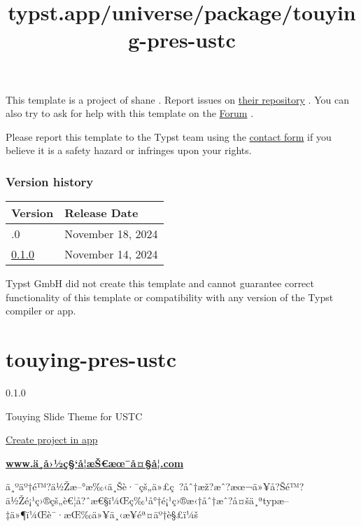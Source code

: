 This template is a project of shane . Report issues on
\href{https://github.com/shaneworld/HHU-Thesis-Template}{their
repository} . You can also try to ask for help with this template on the
\href{https://forum.typst.app}{Forum} .

Please report this template to the Typst team using the
\href{https://typst.app/contact}{contact form} if you believe it is a
safety hazard or infringes upon your rights.

\label{versions}
\subsubsection{Version history}\label{version-history}

\begin{longtable}[]{@{}ll@{}}
\toprule\noalign{}
Version & Release Date \\
\midrule\noalign{}
\endhead
\bottomrule\noalign{}
\endlastfoot
0.2.0 & November 18, 2024 \\
\href{https://typst.app/universe/package/shane-hhu-thesis/0.1.0/}{0.1.0}
& November 14, 2024 \\
\end{longtable}

Typst GmbH did not create this template and cannot guarantee correct
functionality of this template or compatibility with any version of the
Typst compiler or app.


\title{typst.app/universe/package/touying-pres-ustc}

\label{banner}
\label{template-thumbnail}

\section{touying-pres-ustc}\label{touying-pres-ustc}

{ 0.1.0 }

Touying Slide Theme for USTC

\href{/app?template=touying-pres-ustc&version=0.1.0}{Create project in
app}

\label{readme}
\textbf{\href{http://www.xn--fiqs8srwby7cba020i2hih02b.com/}{www.ä¸­å›½ç§`å­¦æŠ€æœ¯å¤§å­¦.com}}

ä¸ºäº†é™?ä½Žæ--°æ‰‹ä¸Šè·¯çš„ä»£ç~?åˆ†æž?æˆ?æœ¬ä»¥å?Šé™?ä½Žé¡¹ç›®çš„è€¦å?ˆæ€§ï¼Œç‰¹å°†é¡¹ç›®æ‹†åˆ†æˆ?å¤šä¸ªtypæ--‡ä»¶ï¼Œè¯·æŒ‰ä»¥ä¸‹æ­¥éª¤äº†è§£ï¼š

